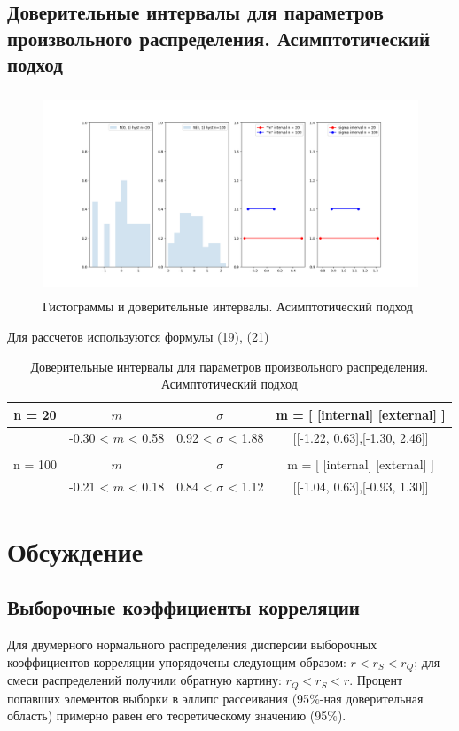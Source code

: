 \documentclass[a4paper]{article}
\begin{document}
\subsection{Доверительные интервалы для параметров произвольного распределения. Асимптотический подход}
    \begin{figure}[H]
		\centering
			\includegraphics[width = 20cm, height = 6cm]{confidence_interval_asymptotics.png}
		\caption{Гистограммы и доверительные интервалы. Асимптотический подход}
		\label{w_pert}
	\end{figure}
	Для рассчетов используются формулы (19), (21)
	\begin{table}[H]
	    \centering
	    \begin{tabular}{| c | c | c | c |}
	    \hline
	       n = 20   &  $m$  & $\sigma$ & m = [ [internal] [external] ]\\ \hline
	          &  -0.30 < $m$ < 0.58 & 0.92 < $\sigma$ < 1.88 & [[-1.22, 0.63],[-1.30, 2.46]] \\ \hline
	         &   &  &  \\ \hline
	       n = 100   &  $m$  & $\sigma$ & m = [ [internal] [external] ]\\ \hline
	        & -0.21 < $m$ < 0.18 & 0.84 < $\sigma$ < 1.12 & [[-1.04, 0.63],[-0.93, 1.30]] \\
	   \hline
	    \end{tabular}
	    \caption{Доверительные интервалы для параметров произвольного распределения. Асимптотический подход}
	    \label{tab:interv_asimpt}
	\end{table}
\section{Обсуждение}
\subsection{Выборочные коэффициенты корреляции}
\noindent Для двумерного нормального распределения дисперсии выборочных коэффициентов корреляции упорядочены следующим образом: $r < r_{S} < r_{Q}$; для смеси распределений получили обратную картину: $r_{Q} < r_{S} < r$.
\newline
\noindent Процент попавших элементов выборки в эллипс рассеивания (95$\%$-ная доверительная область) примерно равен его теоретическому значению (95$\%$).
\end{document}
